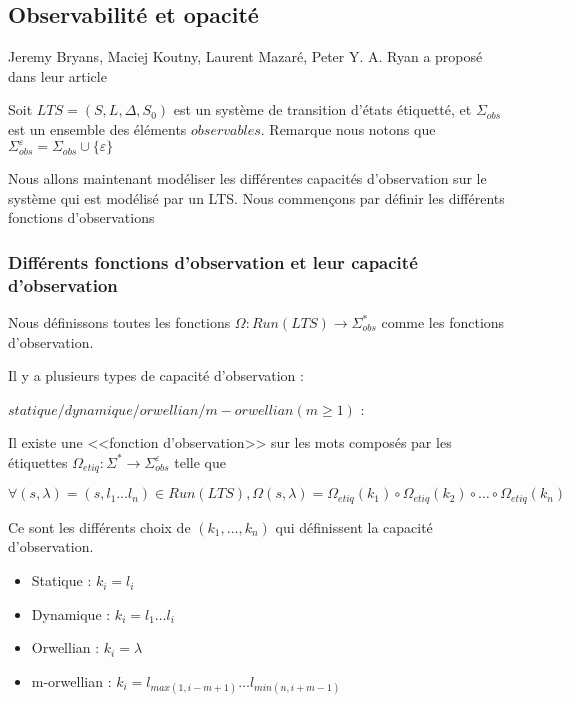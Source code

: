 \documentclass[10pt,a4paper]{article}
\begin{document}
\subsection{Observabilit\'e et opacit\'e}

Jeremy Bryans, Maciej Koutny, Laurent Mazar{\'{e}}, Peter Y. A. Ryan a propos\'e dans leur article ~\cite{BryansKMR08}

Soit $LTS=(S,L,\Delta,S_0)$ est un syst\`eme de transition d'\'etats \'etiquett\'e, et $\Sigma_{obs}$ est un ensemble des \'el\'ements $observables$. Remarque nous notons que $\Sigma_{obs}^{\varepsilon} = \Sigma_{obs} \cup \{\varepsilon\}$

Nous allons maintenant mod\'eliser les diff\'erentes capacit\'es d'observation sur le syst\`eme qui est mod\'elis\'e par un LTS. Nous commen\c cons par d\'efinir les diff\'erents fonctions d'observations

\subsubsection{Diff\'erents fonctions d'observation et leur capacit\'e d'observation}

Nous d\'efinissons toutes les fonctions $\Omega : Run(LTS) \rightarrow \Sigma_{obs}^*$ comme les fonctions   
 d'observation.
 
Il y a plusieurs types de capacit\'e d'observation : 


$statique/dynamique/orwellian/m-orwellian(m\geq 1)$ :
		
Il existe une <<fonction d'observation>> sur les mots compos\'es par les \'etiquettes $\Omega_{etiq} : \Sigma^* \rightarrow \Sigma_{obs}^{\varepsilon}$ telle que 
	
	$$\forall (s,\lambda)= (s,l_1\dots l_n) \in Run(LTS), \Omega(s,\lambda) = \Omega_{etiq}(k_1)\circ\Omega_{etiq}(k_2)\circ\dots\circ\Omega_{etiq}(k_n)$$
	
	Ce sont les diff\'erents choix de $(k_1,\dots, k_n)$ qui d\'efinissent la capacit\'e d'observation.
	



\begin{itemize}
        \item Statique : $k_i = l_i$ 
	\item Dynamique : $k_i = l_1 \dots l_i$
	\item Orwellian : $k_i = \lambda$
	\item m-orwellian : $k_i = l_{max(1,i-m+1)} \dots l_{min(n,i+m-1)}$		

\end{itemize}
\end{document}
